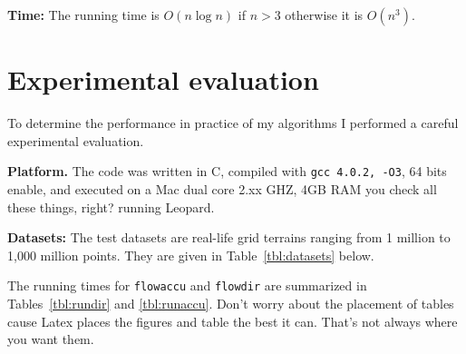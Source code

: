 \documentclass[11pt,twocolumn]{article}
\begin{document}
{\bf Time: } The running time is $O(n \log n)$ if $n > 3$ otherwise it
is $O(n^3)$. 




\section{Experimental evaluation}

To determine the performance in practice of my algorithms I performed
a careful experimental evaluation.

{\bf Platform.} The code was written in C, compiled with \texttt{gcc
  4.0.2, -O3}, 64 bits enable, and executed on a Mac dual core 2.xx
GHZ, 4GB RAM you check all these things, right? running Leopard.

{\bf Datasets: } The test datasets are real-life grid terrains ranging
from 1 million to 1,000 million points.  They are given in
Table~\ref{tbl:datasets} below.


\begin{table}[htp]
  \caption{Size of terrain datasets.}
  \label{tbl:datasets}
\end{table}
      

The running times for \texttt{flowaccu} and \texttt{flowdir} are
summarized in Tables~\ref{tbl:rundir} and \ref{tbl:runaccu}. Don't
worry about the placement of tables cause Latex places the figures and
table the best it can. That's not always where you want them.

\begin{table}[htp]
  \caption{Running times (seconds) and CPU-utilization for
    \texttt{flowdir}.}
  \label{tbl:rundir}
\end{table}
\end{document}
